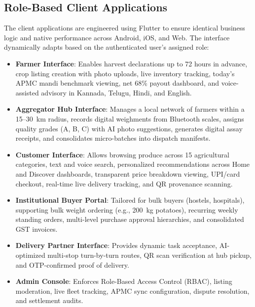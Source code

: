 \subsection{Role-Based Client Applications}
The client applications are engineered using Flutter to ensure identical business logic and native performance across Android, iOS, and Web. The interface dynamically adapts based on the authenticated user's assigned role:
\begin{itemize}
    \item \textbf{Farmer Interface}: Enables harvest declarations up to 72 hours in advance, crop listing creation with photo uploads, live inventory tracking, today's APMC mandi benchmark viewing, net 68\% payout dashboard, and voice-assisted advisory in Kannada, Telugu, Hindi, and English.
    \item \textbf{Aggregator Hub Interface}: Manages a local network of farmers within a 15--30~km radius, records digital weighments from Bluetooth scales, assigns quality grades (A, B, C) with AI photo suggestions, generates digital assay receipts, and consolidates micro-batches into dispatch manifests.
    \item \textbf{Customer Interface}: Allows browsing produce across 15 agricultural categories, text and voice search, personalized recommendations across Home and Discover dashboards, transparent price breakdown viewing, UPI/card checkout, real-time live delivery tracking, and QR provenance scanning.
    \item \textbf{Institutional Buyer Portal}: Tailored for bulk buyers (hostels, hospitals), supporting bulk weight ordering (e.g., 200~kg potatoes), recurring weekly standing orders, multi-level purchase approval hierarchies, and consolidated GST invoices.
    \item \textbf{Delivery Partner Interface}: Provides dynamic task acceptance, AI-optimized multi-stop turn-by-turn routes, QR scan verification at hub pickup, and OTP-confirmed proof of delivery.
    \item \textbf{Admin Console}: Enforces Role-Based Access Control (RBAC), listing moderation, live fleet tracking, APMC sync configuration, dispute resolution, and settlement audits.
\end{itemize}

